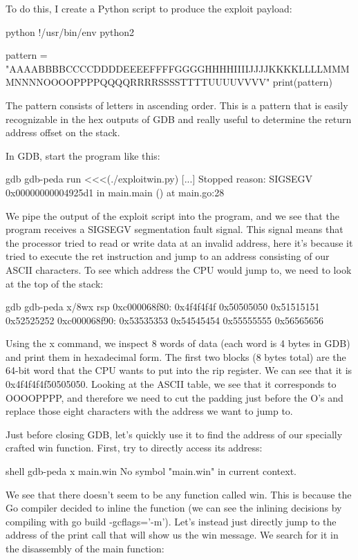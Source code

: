     To do this, I create a Python script to produce the exploit payload:

    python
    !/usr/bin/env python2

    pattern = "AAAABBBBCCCCDDDDEEEEFFFFGGGGHHHHIIIIJJJJKKKKLLLLMMMMNNNNOOOOPPPPQQQQRRRRSSSSTTTTUUUUVVVV"
    print(pattern)


    The pattern consists of letters in ascending order. This is a pattern that is easily recognizable in the hex outputs
    of GDB and really useful to determine the return address offset on the stack.

    In GDB, start the program like this:

    gdb
    gdb-peda run <<<(./exploitwin.py)
    [...]
    Stopped reason: SIGSEGV
    0x00000000004925d1 in main.main () at main.go:28


    We pipe the output of the exploit script into the program, and we see that the program receives a SIGSEGV segmentation
    fault signal. This signal means that the processor tried to read or write data at an invalid address, here it's because
    it tried to execute the ret instruction and jump to an address consisting of our ASCII characters. To see
    which address the CPU would jump to, we need to look at the top of the stack:

    gdb
    gdb-peda x/8wx rsp
    0xc000068f80:	0x4f4f4f4f	0x50505050	0x51515151	0x52525252
    0xc000068f90:	0x53535353	0x54545454	0x55555555	0x56565656


    Using the x command, we inspect 8 words of data (each word is 4 bytes in GDB) and print them in hexadecimal form. The
    first two blocks (8 bytes total) are the 64-bit word that the CPU wants to put into the rip register. We
    can see that it is 0x4f4f4f4f50505050. Looking at the ASCII table, we see that it corresponds to OOOOPPPP, and
    therefore we need to cut the padding just before the O's and replace those eight characters with the address we want to
    jump to.

    Just before closing GDB, let's quickly use it to find the address of our specially crafted win function. First, try
    to directly access its address:

    shell
    gdb-peda x main.win
    No symbol "main.win" in current context.


    We see that there doesn't seem to be any function called win. This is because the Go compiler decided to inline the
    function (we can see the inlining decisions by compiling with go build -gcflags='-m'). Let's instead just directly
    jump to the address of the print call that will show us the win message. We search for it in the disassembly of the
    main function:

